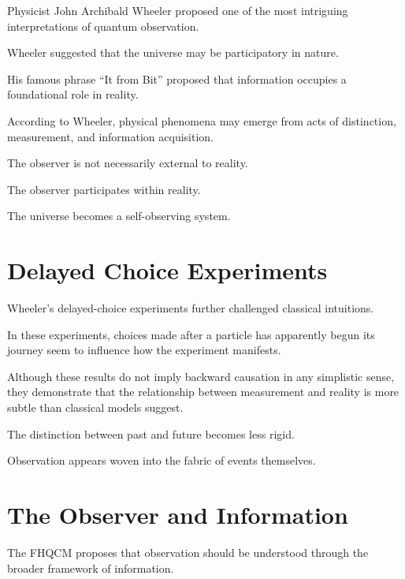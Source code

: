 Physicist John Archibald Wheeler proposed one of the most intriguing interpretations of quantum observation.

Wheeler suggested that the universe may be participatory in nature.

His famous phrase ``It from Bit'' proposed that information occupies a foundational role in reality.

According to Wheeler, physical phenomena may emerge from acts of distinction, measurement, and information acquisition.

The observer is not necessarily external to reality.

The observer participates within reality.

The universe becomes a self-observing system.


\section{Delayed Choice Experiments}

Wheeler's delayed-choice experiments further challenged classical intuitions.

In these experiments, choices made after a particle has apparently begun its journey seem to influence how the experiment manifests.

Although these results do not imply backward causation in any simplistic sense, they demonstrate that the relationship between measurement and reality is more subtle than classical models suggest.

The distinction between past and future becomes less rigid.

Observation appears woven into the fabric of events themselves.


\section{The Observer and Information}

The FHQCM proposes that observation should be understood through the broader framework of information.

